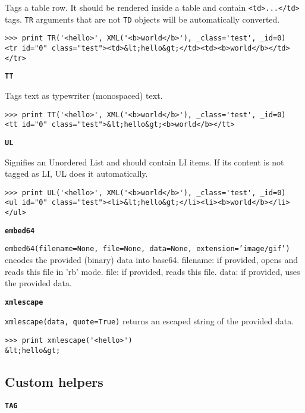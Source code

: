 \documentclass[justified,sixbynine,notoc]{tufte-book}
\def\ft{\small\tt}
\def\inxx#1{\index{#1}}
\begin{document}
\begin{fullwidth}
\inxx{TR}

Tags a table row. It should be rendered inside a table and contain {\ft <td>...</td>} tags. {\ft TR} arguments that are not {\ft TD} objects will be automatically converted.
\begin{lstlisting}
>>> print TR('<hello>', XML('<b>world</b>'), _class='test', _id=0)
<tr id="0" class="test"><td>&lt;hello&gt;</td><td><b>world</b></td></tr>
\end{lstlisting}

{\bf {\ft TT}}

\inxx{TT}

Tags text as typewriter (monospaced) text.
\begin{lstlisting}
>>> print TT('<hello>', XML('<b>world</b>'), _class='test', _id=0)
<tt id="0" class="test">&lt;hello&gt;<b>world</b></tt>
\end{lstlisting}

{\bf {\ft UL}}

Signifies an Unordered List and should contain LI items. If its content is not tagged as LI, UL does it automatically.

\inxx{UL}
\begin{lstlisting}
>>> print UL('<hello>', XML('<b>world</b>'), _class='test', _id=0)
<ul id="0" class="test"><li>&lt;hello&gt;</li><li><b>world</b></li></ul>
\end{lstlisting}

{\bf {\ft embed64}}

{\ft embed64(filename=None, file=None, data=None, extension='image/gif')} encodes the provided (binary) data into base64.
\noindent filename: if provided, opens and reads this file in 'rb' mode.
file: if provided, reads this file.
data: if provided, uses the provided data.

\inxx{embed64}

{\bf {\ft xmlescape}}

{\ft xmlescape(data, quote=True)} returns an escaped string of the provided data.

\inxx{xmlescape}
\begin{lstlisting}
>>> print xmlescape('<hello>')
&lt;hello&gt;
\end{lstlisting}

\goodbreak\subsection{Custom helpers}

{\bf {\ft TAG}}


\end{fullwidth}
\end{document}
